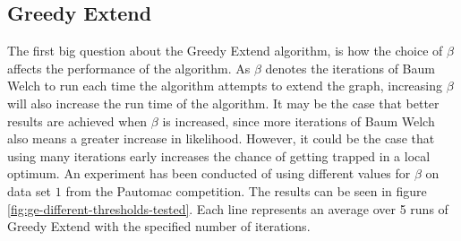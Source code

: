 \subsection{Greedy Extend}

The first big question about the Greedy Extend algorithm, is how the choice of $\beta$ affects the performance of the algorithm.
As $\beta$ denotes the iterations of Baum Welch to run each time the algorithm attempts to extend the graph, increasing $\beta$ will also increase the run time of the algorithm. It may be the case that better results are achieved when $\beta$ is increased, since more iterations of Baum Welch also means a greater increase in likelihood. However, it could be the case that using many iterations early increases the chance of getting trapped in a local optimum.
An experiment has been conducted of using different values for $\beta$ on data set $1$ from the Pautomac competition. The results can be seen in figure \ref{fig:ge-different-thresholds-tested}. Each line represents an average over 5 runs of Greedy Extend with the specified number of iterations.
  


